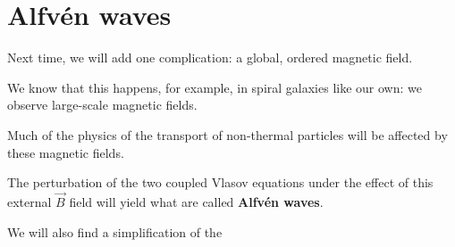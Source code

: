 \documentclass[main.tex]{subfiles}
\begin{document}
\section{Alfvén waves}

Next time, we will add one complication: a global, ordered magnetic field. 

We know that this happens, for example, in spiral galaxies like our own: we observe large-scale magnetic fields.  

Much of the physics of the transport of non-thermal particles will be affected by these magnetic fields. 

The perturbation of the two coupled Vlasov equations under the effect of this external \(\vec{B}\) field will yield what are called \textbf{Alfvén waves}.

We will also find a simplification of the 
\end{document}
